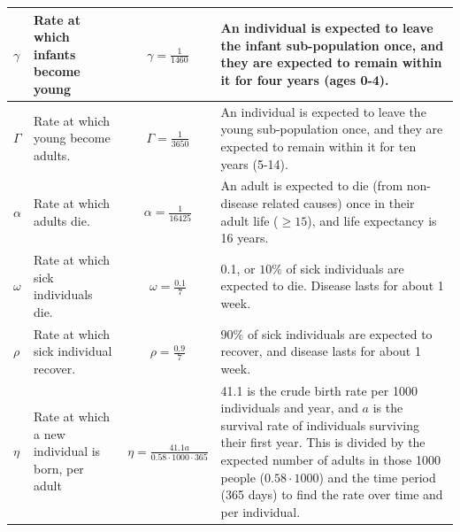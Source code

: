 \documentclass[10pt,a4paper]{article}
\begin{document}
\begin{appendices}
\begin{longtable}{l|p{4cm}|c|p{4cm}}
	$\gamma$						& Rate at which infants become young							& $\gamma = \frac{1}{1460}$					& An individual is expected to leave the infant sub-population once, and they are expected to remain within it for four years (ages 0-4).																										\\ \hline
	$\Gamma$						& Rate at which young become adults.							& $\Gamma = \frac{1}{3650}$					& An individual is expected to leave the young sub-population once, and they are expected to remain within it for ten years (5-14).																												\\ \hline
	$\alpha$						& Rate at which adults die.										& $\alpha = \frac{1}{16425}$				& An adult is expected to die (from non-disease related causes) once in their adult life ($\geq 15$), and life expectancy is 16 years.																											\\ \hline
	$\omega$						& Rate at which sick individuals die.							& $\omega = \frac{0.1}{7}$					& 0.1, or $10\%$ of sick individuals are expected to die. Disease lasts for about 1 week.																																					\\ \hline
	$\rho$							& Rate at which sick individual recover.						& $\rho = \frac{0.9}{7}$					& $90\%$ of sick individuals are expected to recover, and disease lasts for about 1 week.																																					\\ \hline
	$\eta$							& Rate at which a new individual is born, per adult			& $\eta = \frac{41.1 a}{0.58 \cdot 1000 \cdot 365}$	& 41.1 is the crude birth rate per 1000 individuals and year, and $a$ is the survival rate of individuals surviving their first year. This is divided by the expected number of adults in those 1000 people ($0.58 \cdot 1000$) and the time period (365 days) to find the rate over time and per individual.																																		\\ \hline
	
\end{longtable}


\end{appendices}



\end{document}
